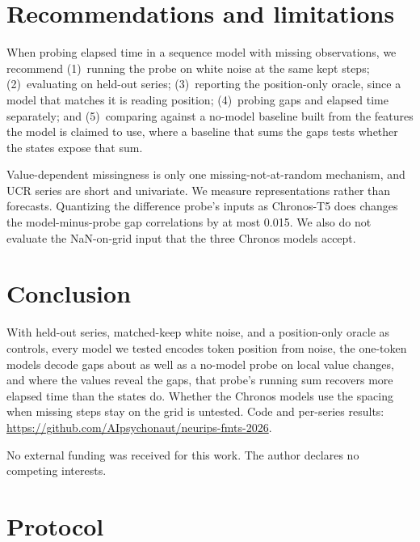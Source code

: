 \documentclass{article}
\begin{document}
\section{Recommendations and limitations}
\label{sec:recs}
\label{sec:limits}

When probing elapsed time in a sequence model with missing observations, we recommend (1)~running the probe on white noise at the same kept steps; (2)~evaluating on held-out series; (3)~reporting the position-only oracle, since a model that matches it is reading position; (4)~probing gaps and elapsed time separately; and (5)~comparing against a no-model baseline built from the features the model is claimed to use, where a baseline that sums the gaps tests whether the states expose that sum.

Value-dependent missingness is only one missing-not-at-random mechanism, and UCR series are short and univariate.
We measure representations rather than forecasts.
Quantizing the difference probe's inputs as Chronos-T5 does changes the model-minus-probe gap correlations by at most 0.015.
We also do not evaluate the NaN-on-grid input that the three Chronos models accept.

\section{Conclusion}
\label{sec:conc}

With held-out series, matched-keep white noise, and a position-only oracle as controls, every model we tested encodes token position from noise, the one-token models decode gaps about as well as a no-model probe on local value changes, and where the values reveal the gaps, that probe's running sum recovers more elapsed time than the states do.
Whether the Chronos models use the spacing when missing steps stay on the grid is untested.
Code and per-series results: \url{https://github.com/AIpsychonaut/neurips-fmts-2026}.

\begin{ack}
No external funding was received for this work.
The author declares no competing interests.
\end{ack}

{\small


}

\appendix

\section{Protocol}
\label{app:protocol}
\end{document}
